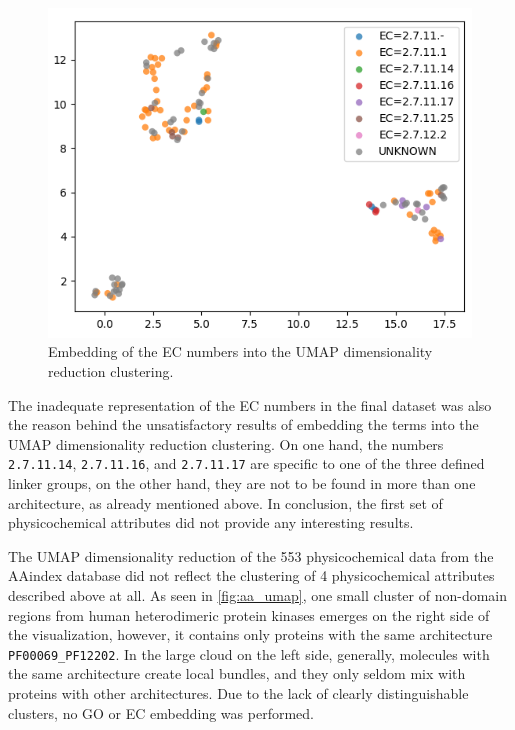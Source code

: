 		\begin{figure}
			\centering
			\includegraphics[width=0.8\linewidth]{img/linker_umap_ec.png}
			\caption{Embedding of the EC numbers into the UMAP dimensionality reduction
			clustering.}
			\label{fig:umap_ec}
		\end{figure}

		The inadequate representation of the EC numbers in the final dataset was also the
		reason behind the unsatisfactory results of embedding the terms into the UMAP
		dimensionality reduction clustering.
		On one hand, the numbers \texttt{2.7.11.14}, \texttt{2.7.11.16}, and
		\texttt{2.7.11.17} are specific to one of the three defined linker groups, on the
		other hand, they are not to be found in more than one architecture, as already
		mentioned above.
		In conclusion, the first set of physicochemical attributes did not provide any
		interesting results.

\label{res:second}

	The UMAP dimensionality reduction of the 553 physicochemical data from the AAindex
	database did not reflect the clustering of 4 physicochemical attributes described above
	at all.
	As seen in \cref{fig:aa_umap}, one small cluster of non-domain regions from human
	heterodimeric protein kinases emerges on the right side of the visualization, however,
	it contains only proteins with the same architecture \texttt{PF00069\_PF12202}.
	In the large cloud on the left side, generally, molecules with the same architecture
	create local bundles, and they only seldom mix with proteins with other
	architectures.
	Due to the lack of clearly distinguishable clusters, no GO or EC embedding was
	performed.

